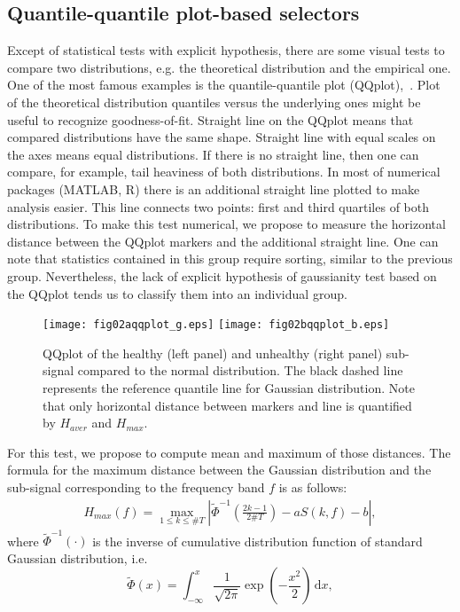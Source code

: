 \documentclass[3p,times]{elsarticle}
\begin{document}
\subsection{Quantile-quantile plot-based selectors}
Except of statistical tests with explicit hypothesis, there are some visual tests to compare two distributions, e.g. the theoretical distribution and the empirical one. One of the most famous examples is the quantile-quantile plot (QQplot),~\cite{bib11}. Plot of the theoretical distribution quantiles versus the underlying ones might be useful to recognize goodness-of-fit. Straight line on the QQplot means that compared distributions have the same shape. Straight line with equal scales on the axes means equal distributions. If there is no straight line, then one can compare, for example, tail heaviness of both distributions. In most of numerical packages (MATLAB, R) there is an additional straight line plotted to make analysis easier. This line connects two points: first and third quartiles of both distributions. To make this test numerical, we propose to measure the horizontal distance between the QQplot markers and the additional straight line. One can note that statistics contained in this group require sorting, similar to the previous group. Nevertheless, the lack of explicit hypothesis of gaussianity test based on the QQplot tends us to classify them into an individual group.\\
\begin{figure}[!ht]
\begin{center}
\texttt{[image: fig02aqqplot\_g.eps]}
\texttt{[image: fig02bqqplot\_b.eps]}
\caption{QQplot of the healthy (left panel) and unhealthy (right panel) sub-signal compared to the normal distribution. The black dashed line represents the reference quantile line for Gaussian distribution. Note that only horizontal distance between markers and line is quantified by $H_{aver}$ and $H_{max}$.}\label{fig2}
\end{center}
\end{figure}
For this test, we propose to compute mean and maximum of those distances. The formula for the maximum distance between the Gaussian distribution and the sub-signal corresponding to the frequency band $f$ is as follows:
\begin{eqnarray}
H_{max}(f)=\max_{1\leq k \leq \#T}{ \left| \widetilde{\Phi}^{-1}\left(\frac{2k-1}{2\#T} \right) - a S(k,f)-b \right| },
\end{eqnarray}
where $\widetilde{\Phi}^{-1}(\cdot)$ is the inverse of cumulative distribution function of standard Gaussian distribution, i.e. $$\widetilde{\Phi}(x)=\int^{x}_{-\infty} \! \frac{1}{\sqrt{2\pi}}\exp \left( -\frac{x^2}{2} \right) \, \mathrm{d} x,$$ 
\end{document}
